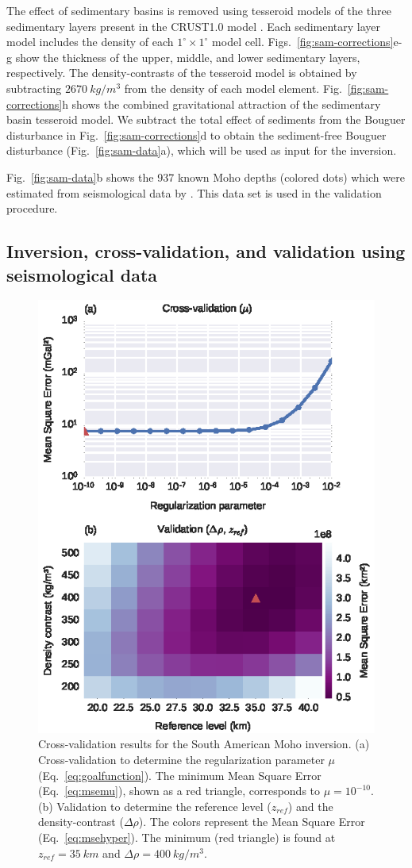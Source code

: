 \documentclass[extra,mreferee]{gji}
\begin{document}
The effect of sedimentary basins is removed using
tesseroid models of the three sedimentary layers present in the CRUST1.0 model
\citep[][ \url{http://igppweb.ucsd.edu/~gabi/rem.html}]{laske2013}.
Each sedimentary layer model includes the density
of each $1^\circ \times 1^\circ$ model cell.
Figs.~\ref{fig:sam-corrections}e-g show the thickness of the upper, middle, and
lower sedimentary layers, respectively.
The density-contrasts of the tesseroid model is obtained by subtracting
$2670\ kg/m^3$ from the density of each model element.
Fig.~\ref{fig:sam-corrections}h shows the combined gravitational attraction of
the sedimentary basin tesseroid model.
We subtract the total effect of sediments from the Bouguer disturbance in
Fig.~\ref{fig:sam-corrections}d to obtain
the sediment-free Bouguer disturbance (Fig.~\ref{fig:sam-data}a),
which will be used as input for the inversion.

Fig.~\ref{fig:sam-data}b shows the 937 known Moho depths (colored dots) which
were estimated from seismological data by \citet{assumpcao2013a}.
This data set is used in the validation procedure.


\subsection{Inversion, cross-validation, and validation using seismological
data}

\begin{figure}
    \centering
    \includegraphics[width=0.5\columnwidth]{figures/south-america-cv}
    \caption{
        Cross-validation results for the South American Moho inversion.
        (a) Cross-validation to determine the regularization parameter $\mu$
        (Eq.~\ref{eq:goalfunction}).
        The minimum Mean Square Error (Eq.~\ref{eq:msemu}),
        shown as a red triangle,
        corresponds to $\mu = 10^{-10}$.
        (b) Validation to determine
        the reference level ($z_{ref}$) and the density-contrast ($\Delta\rho$).
        The colors represent the Mean Square Error (Eq.~\ref{eq:msehyper}).
        The minimum (red triangle) is found at $z_{ref} = 35\ km$
        and $\Delta\rho = 400\ kg/m^3$.
    }
    \label{fig:sam-cv}
\end{figure}
\end{document}
